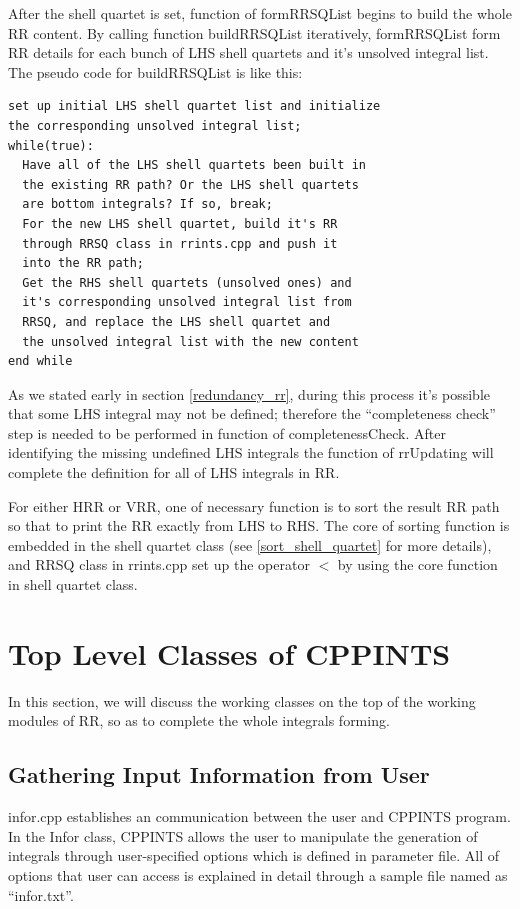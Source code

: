 After the shell quartet is set, function of formRRSQList begins to build 
the whole RR content. By calling function buildRRSQList iteratively, 
formRRSQList form RR details for each bunch of LHS shell quartets and it's 
unsolved integral list. The pseudo code for buildRRSQList is like this:
\begin{verbatim}
set up initial LHS shell quartet list and initialize 
the corresponding unsolved integral list;
while(true):  
  Have all of the LHS shell quartets been built in
  the existing RR path? Or the LHS shell quartets
  are bottom integrals? If so, break;
  For the new LHS shell quartet, build it's RR 
  through RRSQ class in rrints.cpp and push it
  into the RR path;
  Get the RHS shell quartets (unsolved ones) and 
  it's corresponding unsolved integral list from
  RRSQ, and replace the LHS shell quartet and 
  the unsolved integral list with the new content
end while 
\end{verbatim}

As we stated early in section \ref{redundancy_rr}, during 
this process it's possible that some LHS integral may 
not be defined; therefore the ``completeness check''
step is needed to be performed in function of completenessCheck.
After identifying the missing undefined LHS integrals
the function of rrUpdating will complete the definition
for all of LHS integrals in RR.

For either HRR or VRR, one of necessary function is to sort
the result RR path so that to print the RR exactly from 
LHS to RHS. The core of sorting function is embedded in the 
shell quartet class (see \ref{sort_shell_quartet} for more 
details), and RRSQ class in rrints.cpp set up the operator
$<$ by using the core function in shell quartet class.

\section{Top Level Classes of CPPINTS}

In this section, we will discuss the working classes on the top of 
the working modules of RR, so as to complete the whole integrals
forming.

\subsection{Gathering Input Information from User}
\label{infor_class}

infor.cpp establishes an communication between the user and CPPINTS
program. In the Infor class, CPPINTS allows the user to manipulate
the generation of integrals through user-specified options which is 
defined in parameter file. All of options that user can access is 
explained in detail through a sample file named as ``infor.txt''. 




